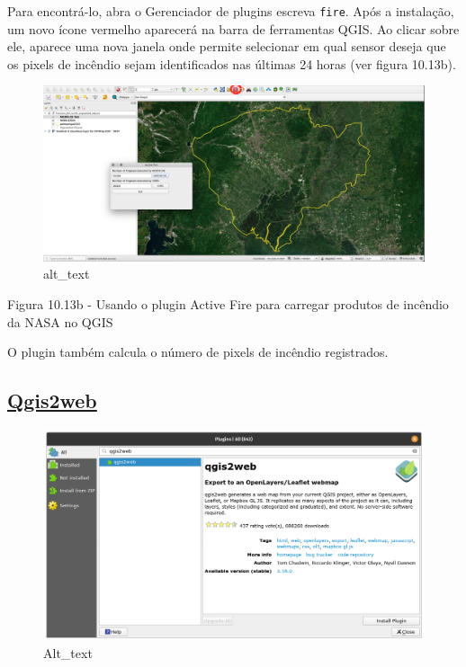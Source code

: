 \documentclass[
  portuguese,
]{krantz}
\begin{document}
Para encontrá-lo, abra o Gerenciador de plugins escreva \texttt{fire}. Após a instalação, um novo ícone vermelho aparecerá na barra de ferramentas QGIS. Ao clicar sobre ele, aparece uma nova janela onde permite selecionar em qual sensor deseja que os pixels de incêndio sejam identificados nas últimas 24 horas (ver figura 10.13b).

\begin{figure}
\centering
\includegraphics{media/modulo10/fig1013_b.png}
\caption{alt\_text}
\end{figure}

Figura 10.13b - Usando o plugin Active Fire para carregar produtos de incêndio da NASA no QGIS

O plugin também calcula o número de pixels de incêndio registrados.

\hypertarget{qgis2web}{%
\subsection{\texorpdfstring{\textbf{\href{https://github.com/tomchadwin/qgis2web}{Qgis2web}}}{Qgis2web}}\label{qgis2web}}

\begin{figure}
\centering
\includegraphics{media/modulo10/fig1014_a.png}
\caption{Alt\_text}
\end{figure}
\end{document}
